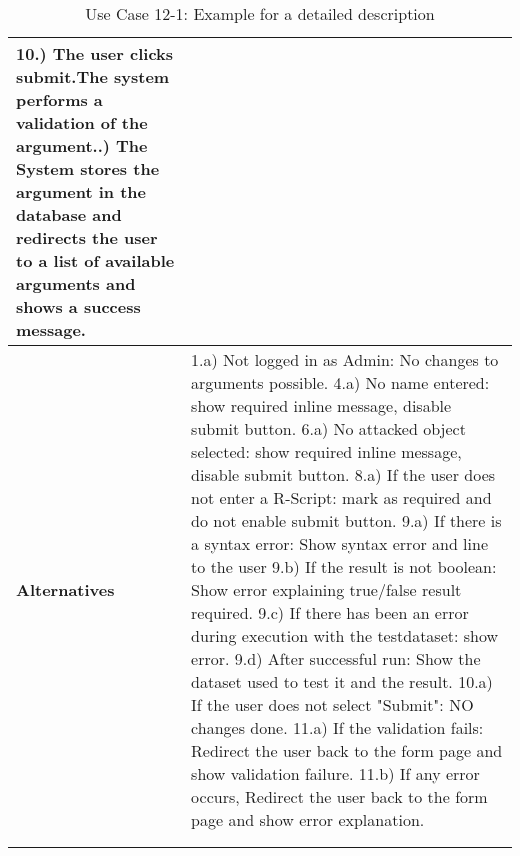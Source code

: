 {\begin{longtable}{|p{2cm} p{11cm}|}
				10.) The user clicks submit.The system performs a validation of the argument.\newline
				11.) The System stores the argument in the database and redirects the user to a list of available arguments and shows a success message.
		\\
		\hline
			\textbf{Alternatives} & 
							1.a) Not logged in as Admin: No changes to arguments possible.
				\newline	4.a) No name entered: show required inline message, disable submit button.
				\newline	6.a) No attacked object selected: show required inline message, disable submit button.
				\newline	8.a) If the user does not enter a R-Script: mark as required and do not enable submit button.
				\newline	9.a) If there is a syntax error: Show syntax error and line to the user
				\newline	9.b) If the result is not boolean: Show error explaining true/false result required.
				\newline	9.c) If there has been an error during execution with the testdataset: show error.
				\newline	9.d) After successful run: Show the dataset used to test it and the result.
				\newline	10.a) If the user does not select "Submit": NO changes done.
				\newline	11.a) If the validation fails: Redirect the user back to the form page and show validation failure.
				\newline	11.b) If any error occurs,  Redirect the user back to the form page and show error explanation.
							\\
		\hline
				\label{uc:12-1}\\
	\caption{Use Case 12-1: Example for a detailed description}
	\end{longtable}
}